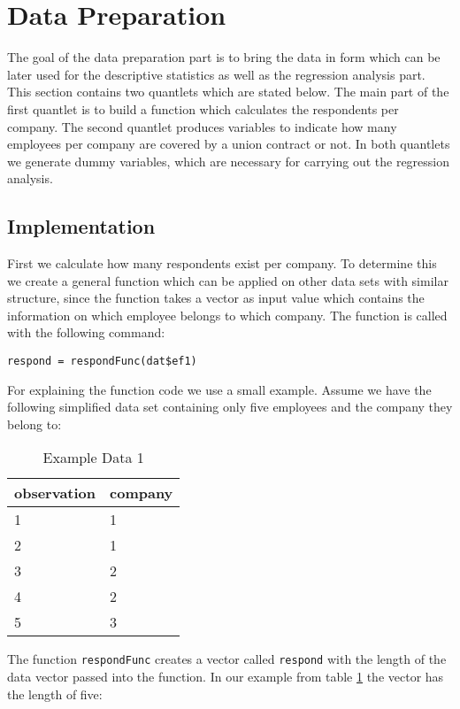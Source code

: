 \section{Data Preparation}\label{Sec:Data_Prep}
The goal of the data preparation part is to bring the data in form which can be later used for the descriptive statistics as well as the regression analysis part. This section contains two quantlets which are stated below. The main part of the first quantlet is to build a function which calculates the respondents per company. The second quantlet produces variables to indicate how many employees per company are covered by a union contract or not. In both quantlets we generate dummy variables, which are necessary for carrying out the regression analysis.

\subsection{Implementation}
First we calculate how many respondents exist per company. To determine this we create a general function which can be applied on other data sets with similar structure, since the function takes a vector as input value which contains the information on which employee belongs to which company. The function is called with the following command:
\lstset{firstnumber = 31}
\begin{lstlisting}
respond = respondFunc(dat$ef1)
\end{lstlisting}
For explaining the function code we use a small example. Assume we have the following simplified data set containing only five employees and the company they belong to:
\begin{table}[h!]
\centering
\caption{Example Data 1}
\label{ex1}
\begin{tabular}{|l|l|}
\hline
observation & company \\ \hline
1           & 1       \\ \hline
2           & 1       \\ \hline
3           & 2       \\ \hline
4           & 2       \\ \hline
5           & 3       \\ \hline
\end{tabular}
\end{table}
\newline
The function \texttt{respondFunc} creates a vector called \texttt{respond} with the length of the data vector passed into the function. In our example from table \ref{ex1} the vector has the length of five:
